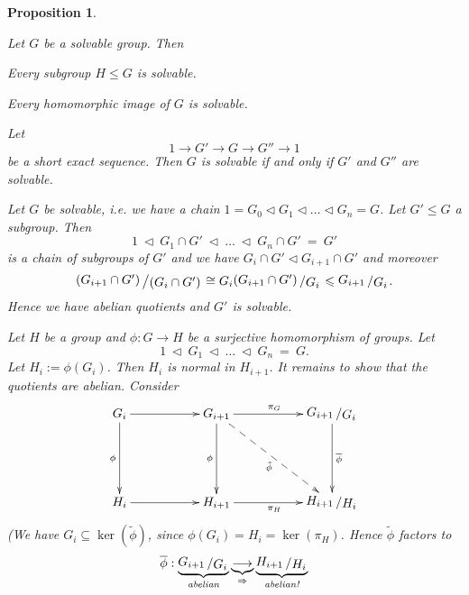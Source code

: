 \documentclass[11pt]{book}
\newtheorem{proposition}[theorem]{Proposition}
\theoremstyle{nonumberbreak}
\newenvironment{pr}[1][]{\ifthenelse{\equal{#1}{}}{\proof}{\proof[#1]}\rm}{\endproof}
\newcommand{\slant}[2]{{\raisebox{.1em}{$#1$}\left/\raisebox{-.1em}{$#2$}\right.}}
\begin{document}
\begin{spacing}{1.3}
\begin{proposition} %
\begin{compactenum}
\item Let $G$ be a solvable group. Then
\begin{compactenum}
\item Every subgroup $H \leqslant G$ is solvable.
\item Every homomorphic image of $G$ is solvable.
\end{compactenum}
\item Let $$1 \longrightarrow G' \longrightarrow G \longrightarrow G'' \longrightarrow 1$$be a short exact sequence. Then $G$ is solvable if and only if $G'$ and $G''$ are solvable.
\end{compactenum}
\begin{pr}
\begin{compactenum}
\item \begin{compactenum}
\item Let $G$ be solvable, i.e. we have a chain $1=G_0 \triangleleft G_1 \triangleleft \dots \triangleleft G_n=G$. Let $G' \leqslant  G$ a subgroup. Then $$1 \ \triangleleft \ G_1 \cap G' \ \triangleleft \ \dots\ \triangleleft \ G_n \cap G' \ = \ G'$$ is a chain of subgroups of $G'$ and we have $G_i \cap G' \triangleleft G_{i+1} \cap G'$ and moreover $$\slant{\left(G_{i+1} \cap G'\right)}{\left(G_{i} \cap G'\right)} \cong G_i \slant{\left(G_{i+1} \cap G'\right)}{G_i} \leqslant \slant{G_{i+1}}{G_i}.$$
Hence we have abelian quotients and $G'$ is solvable.
\item Let $H$ be a group and $\phi: G \longrightarrow H$ be a surjective homomorphism of groups. Let $$1 \ \triangleleft \ G_1 \ \triangleleft \ \dots\ \triangleleft \ G_n\ =\ G.$$ Let $H_i:=\phi(G_i)$. Then $H_i$ is normal in $H_{i+1}$. It remains to show that the quotients are abelian. Consider
$$\begin{xy}
\xymatrix{
G_i \ar[dd]_{\phi} \ar[rr] && G_{i+1} \ar[dd]_{\phi} \ar[rr]^{\pi_G} \ar@{-->}[rrdd]_{\tilde{\phi}} && \slant{G_{i+1}}{G_i} \ar[dd]^{\overline{\phi}} \\ &&&& \\
H_i \ar[rr] && H_{i+1} \ar[rr]_{\pi_H} && \slant{H_{i+1}}{H_i}
}
\end{xy}$$
(We have $G_i \subseteq \ker(\tilde{\phi})$, since $\phi(G_i)=H_i=\ker(\pi_H)$.
Hence $\tilde{\phi}$ factors to $$\overline{\phi}: \underbrace{\slant{G_{i+1}}{G_i}}_{\textit{abelian}} \underbrace{\longrightarrow}_{\Rightarrow} \underbrace{\slant{H_{i+1}}{H_i}}_{\textit{abelian!}}$$

\end{compactenum}
\end{compactenum}
\end{pr}
\end{proposition}
\end{spacing}
\end{document}
